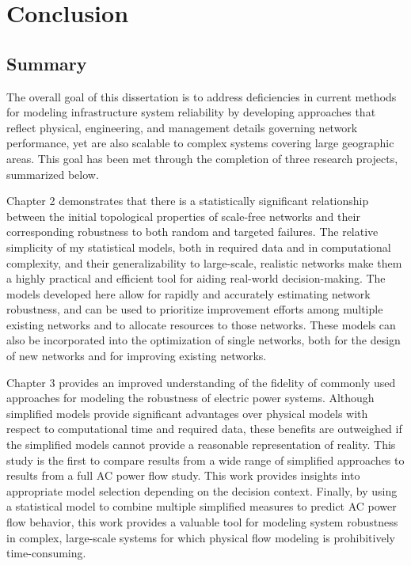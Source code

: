 
\chapter{Conclusion}
\label{ch5}

\section{Summary}
\label{sec:ch5:summary}

The overall goal of this dissertation is to address deficiencies in current methods for modeling infrastructure system reliability by developing approaches that reflect physical, engineering, and management details governing network performance, yet are also scalable to complex systems covering large geographic areas. This goal has been met through the completion of three research projects, summarized below.

Chapter 2 demonstrates that there is a statistically significant relationship between the initial topological properties of scale-free networks and their corresponding robustness to both random and targeted failures. The relative simplicity of my statistical models, both in required data and in computational complexity, and their generalizability to large-scale, realistic networks make them a highly practical and efficient tool for aiding real-world decision-making. The models developed here allow for rapidly and accurately estimating network robustness, and can be used to prioritize improvement efforts among multiple existing networks and to allocate resources to those networks. These models can also be incorporated into the optimization of single networks, both for the design of new networks and for improving existing networks.

Chapter 3 provides an improved understanding of the fidelity of commonly used approaches for modeling the robustness of electric power systems.  Although simplified models provide significant advantages over physical models with respect to computational time and required data, these benefits are outweighed if the simplified models cannot provide a reasonable representation of reality.  This study is the first to compare results from a wide range of simplified approaches to results from a full AC power flow study.  This work provides insights into appropriate model selection depending on the decision context.  Finally, by using a statistical model to combine multiple simplified measures to predict AC power flow behavior, this work provides a valuable tool for modeling system robustness in complex, large-scale systems for which physical flow modeling is prohibitively time-consuming.

